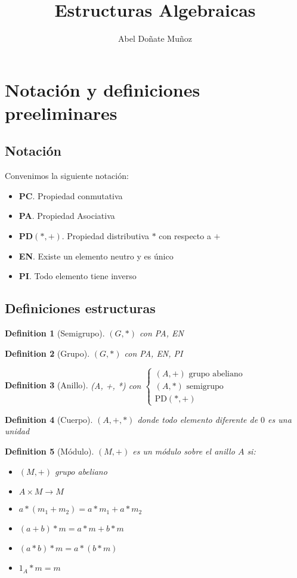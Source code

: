 \documentclass[leqno]{article}
\title{Estructuras Algebraicas}
\author{Abel Doñate Muñoz}
\date{}
\newtheorem*{definition}{Definition}
\begin{document}
\maketitle
\tableofcontents
\newpage

\section{Notación y definiciones preeliminares}
\subsection{Notación}
Convenimos la siguiente notación:
\begin{itemize}[topsep=-6pt, itemsep=0pt]
  \item \textbf{PC}. Propiedad conmutativa
  \item  \textbf{PA}. Propiedad Asociativa
  \item  \textbf{PD$(*, +)$}. Propiedad distributiva $*$ con respecto a $+$
  \item  \textbf{EN}. Existe un elemento neutro y es único
  \item  \textbf{PI}. Todo elemento tiene inverso
\end{itemize}

\subsection{Definiciones estructuras}
\begin{definition}[Semigrupo] $(G, *)$ con PA, EN
\end{definition}

\begin{definition}[Grupo] $(G, *)$ con PA, EN, PI 
\end{definition}

\begin{definition}[Anillo] (A, +, *) con 
  $\begin{cases}
  (A, +) \text{ grupo abeliano}\\
  (A, *) \text{ semigrupo}\\
  \text{PD}(*, +)
\end{cases}$
\end{definition}

\begin{definition}[Cuerpo] $(A, +, *)$ donde todo elemento diferente de  $0$ es una unidad
\end{definition}

\begin{definition}[Módulo] $(M, +)$ es un módulo sobre el anillo $A$ si:
  \begin{itemize}[topsep=-6pt, itemsep=0pt]
    \item $(M, +)$ grupo abeliano
	\item  $A \times M \to M$
	\item $a*(m_1+m_2) = a*m_1 + a*m_2$ 
	\item $(a+b)*m = a*m+b*m$ 
	\item $(a*b)*m =  a*(b*m)$
	\item $1_A*m = m$
  \end{itemize}
\end{definition}
\end{document}
